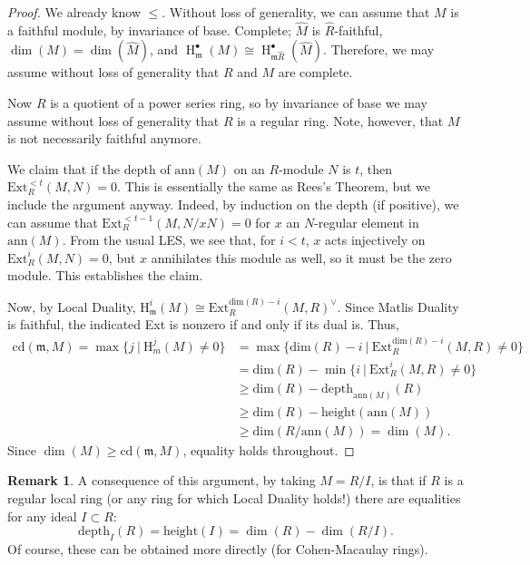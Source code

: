 \documentclass[11pt]{book}
\numberwithin{equation}{section}
\numberwithin{theorem}{chapter}
\theoremstyle{definition}
\newtheorem*{basic properties}{Basic Properties}
\newtheorem*{Important Remark}{Important Remark}
\newtheorem{remark}[theorem]{Remark}
\theoremstyle{remark}
\newcommand{\m}{\mathfrak{m}}
\renewcommand{\dim}{\operatorname{dim}}
\renewcommand{\H}{\operatorname{H}}
\begin{document}
\begin{proof}
	We already know $\leqslant$. Without loss of generality, we can assume that $M$ is a faithful module, by invariance of base. Complete; $\widehat{M}$ is $\widehat{R}$-faithful, $\dim(M) = \dim(\widehat{M})$, and $\H^\bullet_\m(M) \cong \H^\bullet_{\m \widehat{R}} (\widehat{M})$. Therefore, we may assume without loss of generality that $R$ and $M$ are complete.
	
	Now $R$ is a quotient of a power series ring, so by invariance of base we may assume without loss of generality that $R$ is a regular ring. Note, however, that $M$ is not necessarily faithful anymore.
	
	We claim that if the depth of $\mathrm{ann}(M)$ on an $R$-module $N$ is $t$, then $\mathrm{Ext}^{<t}_R(M,N)=0$. This is essentially the same as Rees's Theorem, but we include the argument anyway. Indeed, by induction on the depth (if positive), we can assume that $\mathrm{Ext}^{<t-1}_R(M,N/xN)=0$ for $x$ an $N$-regular element in $\mathrm{ann}(M)$. From the usual LES, we see that, for $i<t$, $x$ acts injectively on $\mathrm{Ext}^{i}_R(M,N)=0$, but $x$ annihilates this module as well, so it must be the zero module. This establishes the claim.
	
	Now, by Local Duality, $\mathrm{H}^i_{{\m}}(M)\cong \mathrm{Ext}_R^{\mathrm{dim}(R)-i}(M,R)^\vee$. Since Matlis Duality is faithful, the indicated Ext is nonzero if and only if its dual is. Thus,
	\begin{align*} \mathrm{cd}(\m,M)=\max\{ j \ | \ \mathrm{H}^j_m(M)\neq 0 \} &= \max\{ \mathrm{dim}(R)-i \ | \ \mathrm{Ext}_R^{\mathrm{dim}(R)-i}(M,R)\neq 0 \} \\ &= \mathrm{dim}(R) - \min\{ i \ | \ \mathrm{Ext}_R^{i}(M,R)\neq 0 \} \\ 
	&\geq \mathrm{dim}(R) - \mathrm{depth}_{\mathrm{ann}(M)}(R) \\ 
	&\geq\mathrm{dim}(R) - \mathrm{height}{(\mathrm{ann}(M))} \\ &\geq \mathrm{dim}(R/\mathrm{ann}(M)) = \dim(M).\end{align*}
	Since $\dim(M)\geq \mathrm{cd}(\m,M)$, equality holds throughout.
\end{proof}

\begin{remark}
	A consequence of this argument, by taking $M=R/I$, is that if $R$ is a regular local ring (or any ring for which Local Duality holds!) there are equalities for any ideal $I\subset R$:
	\[ \mathrm{depth}_I(R)= \mathrm{height}(I) = \dim(R)-\dim(R/I). \]
	Of course, these can be obtained more directly (for Cohen-Macaulay rings).
\end{remark}
\end{document}
